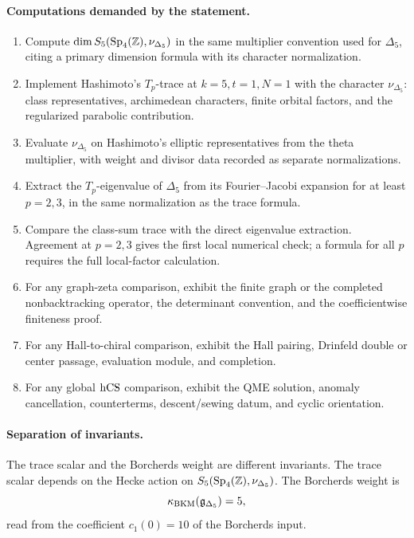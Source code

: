 \paragraph{Computations demanded by the statement.}
\begin{enumerate}
\item Compute \(\dim S_5(\mathrm{Sp}_4(\mathbb{Z}),\nu_{\Delta_5})\) in the same
  multiplier convention used for \(\Delta_5\), citing a primary
  dimension formula with its character normalization.
\item Implement Hashimoto's \(T_p\)-trace at \(k=5,t=1,N=1\) with the
  character \(\nu_{\Delta_5}\): class representatives, archimedean
  characters, finite orbital factors, and the regularized parabolic
  contribution.
\item Evaluate \(\nu_{\Delta_5}\) on Hashimoto's elliptic
  representatives from the theta multiplier, with weight and divisor
  data recorded as separate normalizations.
\item Extract the \(T_p\)-eigenvalue of \(\Delta_5\) from its
  Fourier--Jacobi expansion for at least \(p=2,3\), in the same
  normalization as the trace formula.
\item Compare the class-sum trace with the direct eigenvalue extraction.
  Agreement at \(p=2,3\) gives the first local numerical check; a
  formula for all \(p\) requires the full local-factor calculation.
\item For any graph-zeta comparison, exhibit the finite graph or the
  completed nonbacktracking operator, the determinant convention, and
  the coefficientwise finiteness proof.
\item For any Hall-to-chiral comparison, exhibit the Hall pairing,
  Drinfeld double or center passage, evaluation module, and completion.
\item For any global \(\mathrm{hCS}\) comparison, exhibit the QME solution,
  anomaly cancellation, counterterms, descent/sewing datum, and cyclic
  orientation.
\end{enumerate}

\paragraph{Separation of invariants.}
The trace scalar and the Borcherds weight are different invariants.
The trace scalar depends on the Hecke action on
\(S_5(\mathrm{Sp}_4(\mathbb{Z}),\nu_{\Delta_5})\).  The Borcherds weight is
\[
  \kappa_{\mathrm{BKM}}(\mathfrak g_{\Delta_5})=5,
\]
read from the coefficient \(c_1(0)=10\) of the Borcherds input.

